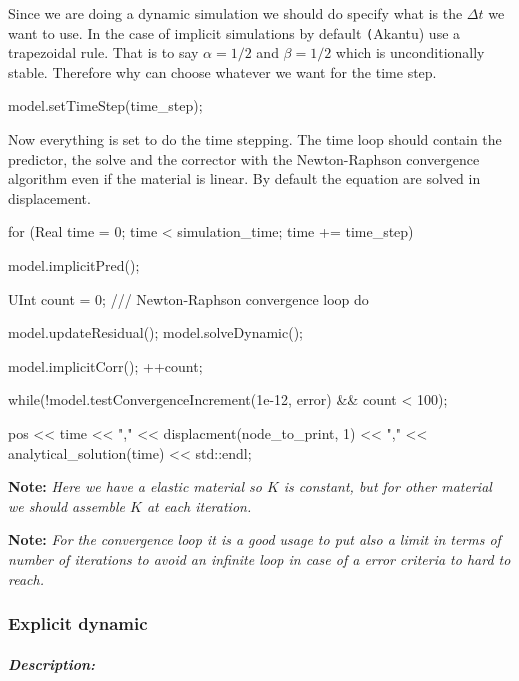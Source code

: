 \documentclass[a4paper,11pt]{book}
\newcommand{\code}[1]{{\tt{#1}}}
\newcommand{\note}[1]{\textbf{Note: }\textit{#1}}
\begin{document}
Since we are doing a dynamic simulation we should do specify what is the $\Delta
t$ we want to use. In  the case of implicit simulations by default \code(Akantu)
use a trapezoidal rule. That is to say $\alpha = 1/2$ and $\beta = 1/2$ which is
unconditionally stable. Therefore  why can choose whatever we  want for the time
step.
\begin{cpp}
  model.setTimeStep(time_step);
\end{cpp}

Now everything is set to do the  time stepping. The time loop should contain the
predictor,  the solve  and  the corrector  with  the Newton-Raphson  convergence
algorithm even if the material is  linear. By default the equation are solved in
displacement.
\begin{cpp}
  for (Real time = 0; time < simulation_time; time += time_step) {
   model.implicitPred();

   UInt count = 0;
   /// Newton-Raphson convergence loop
   do {
     model.updateResidual();
     model.solveDynamic();

     model.implicitCorr();
     ++count;
   } while(!model.testConvergenceIncrement(1e-12, error) && count < 100);

   pos << time
       << "," << displacment(node_to_print, 1)
       << "," << analytical_solution(time) << std::endl;
 }
\end{cpp}

\note{Here we have a elastic material so $K$ is constant, but for other material
  we should assemble $K$ at each iteration.}

\note{For the convergence loop  it is a good usage to put  also a limit in terms
  of number of iterations to avoid an  infinite loop in case of a error criteria
  to hard to reach.}

\subsubsection{Explicit dynamic}

\subparagraph{Description:}\label{ref:smm:explicit:paragraphdescription}
\end{document}

